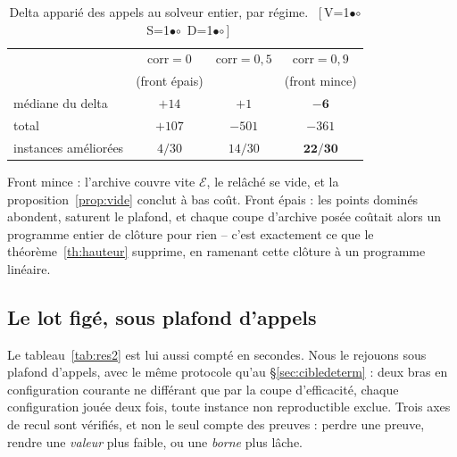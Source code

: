 \documentclass[11pt,a4paper]{article}
\theoremstyle{plain}
\theoremstyle{remark}
\newcommand{\Ecal}{\mathcal{E}}
\newcommand{\cfgm}[1]{\ifnum#1=1$\bullet$\else$\circ$\fi}
\newcommand{\conf}[3]{%
  \textsf{\footnotesize[\,V\cfgm{#1}\ S\cfgm{#2}\ D\cfgm{#3}\,]}}
\begin{document}
\begin{table}[H]
\centering
\caption{Delta apparié des appels au solveur entier, par régime.\ \conf{0}{0}{0}}
\label{tab:corr}
\begin{tabular}{lccc}
\toprule
& $\text{corr}=0$ & $\text{corr}=0{,}5$ & $\text{corr}=0{,}9$\\
& (front épais) & & (front mince)\\
\midrule
médiane du delta      & $+14$ & $+1$ & $\mathbf{-6}$\\
total                 & $+107$ & $-501$ & $-361$\\
instances améliorées  & $4/30$ & $14/30$ & $\mathbf{22/30}$\\
\bottomrule
\end{tabular}
\end{table}

\noindent
Front mince : l'archive couvre vite $\Ecal$, le relâché se vide, et la
proposition~\ref{prop:vide} conclut à bas coût. Front épais : les points
dominés abondent, saturent le plafond, et chaque coupe d'archive posée
coûtait alors un programme entier de clôture pour rien -- c'est exactement
ce que le théorème~\ref{th:hauteur} supprime, en ramenant cette clôture à un
programme linéaire.

\subsection{Le lot figé, sous plafond d'appels}
\label{sec:lotdeterm}

Le tableau~\ref{tab:res2} est lui aussi compté en secondes. Nous le rejouons
sous plafond d'appels, avec le même protocole qu'au
§\ref{sec:cibledeterm} : deux bras en configuration courante ne différant
que par la coupe d'efficacité, chaque configuration jouée deux fois, toute
instance non reproductible exclue. Trois axes de recul sont vérifiés, et non
le seul compte des preuves : perdre une preuve, rendre une \emph{valeur}
plus faible, ou une \emph{borne} plus lâche.
\end{document}
